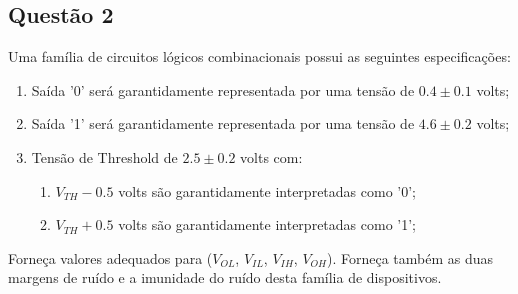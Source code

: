 \documentclass{article}
\begin{document}
        \subsection{Questão 2}
            \begin{exercise}
                Uma família de circuitos lógicos combinacionais possui as seguintes especificações:
                    \begin{enumerate}
                        \item Saída '0' será garantidamente representada por uma tensão de $0.4 \pm 0.1$ volts;
                        \item Saída '1' será garantidamente representada por uma tensão de $4.6 \pm 0.2$ volts;
                        \item Tensão de Threshold de $2.5 \pm 0.2$ volts com:
                            \begin{enumerate}[noitemsep]
                                \item $V_{TH}-0.5$ volts são garantidamente interpretadas como '0';
                                \item $V_{TH}+0.5$ volts são garantidamente interpretadas como '1';
                            \end{enumerate}
                    \end{enumerate}
                Forneça valores adequados para ($V_{OL}$, $V_{IL}$, $V_{IH}$, $V_{OH}$). Forneça também as duas margens de ruído e a imunidade do ruído desta família de dispositivos.
            \end{exercise}
\end{document}
